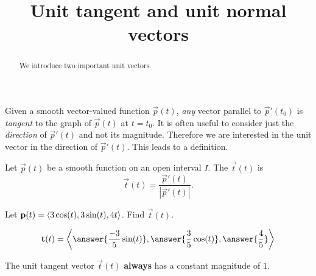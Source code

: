 \documentclass{ximera}
\title[Dig-In:]{Unit tangent and unit normal vectors}
\begin{document}
\begin{abstract}
  We introduce two important unit vectors. 
\end{abstract}
\maketitle


Given a smooth vector-valued function $\vec{p}(t)$, \textit{any}
vector parallel to $\vec{p}'(t_0)$ is \textit{tangent} to the graph of
$\vec{p}(t)$ at $t=t_0$. It is often useful to consider just the
\textit{direction} of $\vec{p}'(t)$ and not its magnitude. Therefore we are
interested in the unit vector in the direction of $\vec{p}'(t)$. This
leads to a definition.
\begin{definition}
Let $\vec{p}(t)$ be a smooth function on an open interval $I$. The
 $\vec{t}(t)$ is  
\[
\vec{t}(t) = \frac{\vec{p}'(t)}{|\vec{p}'(t)|}.
\]
\end{definition}

\begin{question}
  Let $\mathbf{p}(t) = \left\langle 3\cos(t), 3\sin(t), 4t\right\rangle$. Find $\vec{t}(t)$.
  \begin{prompt}
    \[
    \vec{t}(t) = \vector{\answer{\frac{-3}{5}\sin(t)},\answer{\frac{3}{5}\cos(t)},\answer{\frac{4}{5}}}
    \]
    \begin{feedback}
      The unit tangent vector $\vec{t}(t)$ \textbf{always} has a constant
      magnitude of $1$.
    \end{feedback}
  \end{prompt}
\end{question}
\end{document}
